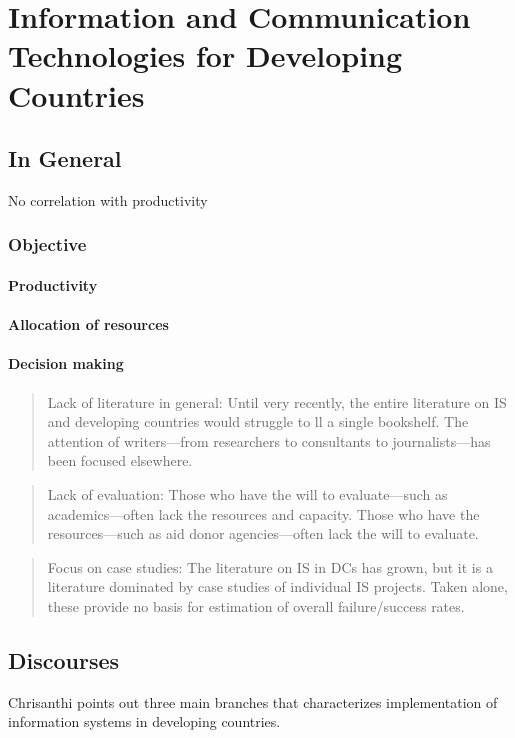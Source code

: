 \chapter{Information and Communication Technologies for Developing Countries}
\section{In General}
No correlation with productivity \cite{rh:isdc}
\subsection{Objective}
\subsubsection{Productivity}
\subsubsection{Allocation of resources}
\subsubsection{Decision making}

\begin{quotation}
Lack of literature in general: Until very recently,
the entire literature on IS and developing countries
would struggle to ll a single bookshelf. The
attention of writers—from researchers to consultants
to journalists—has been focused elsewhere.\cite{rh:isdc}
\end{quotation}
\begin{quotation}
Lack of evaluation: Those who have the will to
evaluate—such as academics—often lack the
resources and capacity. Those who have the
resources—such as aid donor agencies—often
lack the will to evaluate.\cite{rh:isdc}
\end{quotation}
\begin{quotation}
Focus on case studies: The literature on IS in
DCs has grown, but it is a literature dominated by
case studies of individual IS projects. Taken alone,
these provide no basis for estimation of overall
failure/success rates.\cite{rh:isdc}
\end{quotation}

\section{Discourses}
Chrisanthi \cite{ca:isdc} points out three main branches that characterizes implementation of information systems in developing countries.
